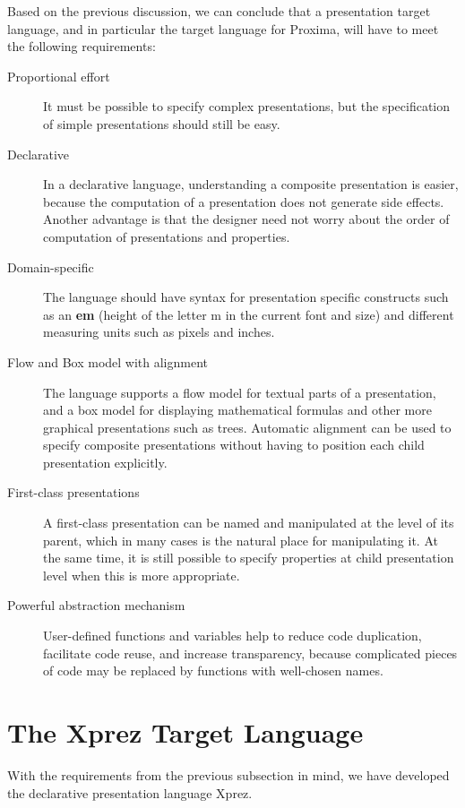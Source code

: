  Based on the previous discussion, we can conclude that a presentation target language, and in particular the target language for Proxima, will have to meet the following requirements: 

\begin{description}
\item[Proportional effort]
It must be possible to specify complex presentations, but the specification of simple presentations should still be easy.
\item[Declarative]
In a declarative language, understanding a composite presentation is easier, because the computation of a presentation does not generate side effects. Another advantage is that the designer need not worry about the order of computation of presentations and properties.
\item[Domain-specific]
The language should have syntax for presentation specific constructs such as an {\bf em} (height of the letter m in the current font and size) and different measuring units such as pixels and inches.
\item[Flow and Box model with alignment]
The language supports a flow model for textual parts of a presentation, and a box model for displaying mathematical formulas and other more graphical presentations such as trees. Automatic alignment can be used to specify composite presentations without having to position each child presentation explicitly.
\item[First-class presentations]
A first-class presentation can be named and manipulated at the level of its parent, which in many cases is the natural place for manipulating it. At the same time, it is still possible to specify properties at child presentation level when this is more appropriate.
\item[Powerful abstraction mechanism]
User-defined functions and var\-i\-ables help to reduce code duplication, facilitate code reuse, and increase transparency, because complicated pieces of code may be replaced by functions with well-chosen names.
\end{description}


%																
%																
%																
\section{The {\sc Xprez} Target Language}
\label{xpreztarget}

With the requirements from the previous subsection in mind, we have developed the declarative presentation language {\sc Xprez}. 


